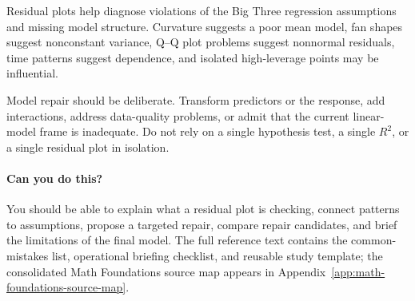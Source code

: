 {Residual plots help diagnose violations of the Big Three regression assumptions and missing model structure.  Curvature suggests a poor mean model, fan shapes suggest nonconstant variance, Q--Q plot problems suggest nonnormal residuals, time patterns suggest dependence, and isolated high-leverage points may be influential.

Model repair should be deliberate.  Transform predictors or the response, add interactions, address data-quality problems, or admit that the current linear-model frame is inadequate.  Do not rely on a single hypothesis test, a single \(R^2\), or a single residual plot in isolation.

\paragraph{Can you do this?}
You should be able to explain what a residual plot is checking, connect patterns to assumptions, propose a targeted repair, compare repair candidates, and brief the limitations of the final model.  The full reference text contains the common-mistakes list, operational briefing checklist, and reusable study template; the consolidated Math Foundations source map appears in Appendix~\ref{app:math-foundations-source-map}.
}
